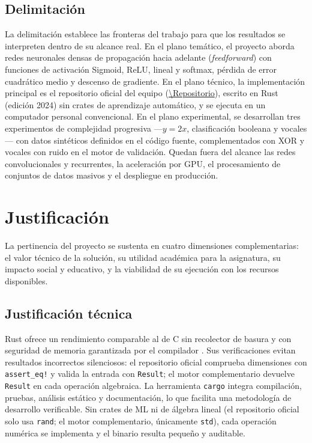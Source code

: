 \subsection{Delimitación}
La delimitación establece las fronteras del trabajo para que los resultados se interpreten dentro de su alcance real. En el plano temático, el proyecto aborda redes neuronales densas de propagación hacia adelante (\emph{feedforward}) con funciones de activación Sigmoid, ReLU, lineal y softmax, pérdida de error cuadrático medio y descenso de gradiente. En el plano técnico, la implementación principal es el repositorio oficial del equipo (\url{\Repositorio}), escrito en Rust (edición 2024) sin crates de aprendizaje automático, y se ejecuta en un computador personal convencional. En el plano experimental, se desarrollan tres experimentos de complejidad progresiva ---$y=2x$, clasificación booleana y vocales--- con datos sintéticos definidos en el código fuente, complementados con XOR y vocales con ruido en el motor de validación. Quedan fuera del alcance las redes convolucionales y recurrentes, la aceleración por GPU, el procesamiento de conjuntos de datos masivos y el despliegue en producción.

\section{Justificación}\label{sec:justificacion}
La pertinencia del proyecto se sustenta en cuatro dimensiones complementarias: el valor técnico de la solución, su utilidad académica para la asignatura, su impacto social y educativo, y la viabilidad de su ejecución con los recursos disponibles.

\subsection{Justificación técnica}
Rust ofrece un rendimiento comparable al de C sin recolector de basura y con seguridad de memoria garantizada por el compilador \citep{klabnik2023,jung2018}. Sus verificaciones evitan resultados incorrectos silenciosos: el repositorio oficial comprueba dimensiones con \texttt{assert\_eq!} y valida la entrada con \texttt{Result}; el motor complementario devuelve \texttt{Result} en cada operación algebraica. La herramienta \texttt{cargo} integra compilación, pruebas, análisis estático y documentación, lo que facilita una metodología de desarrollo verificable. Sin crates de ML ni de álgebra lineal (el repositorio oficial solo usa \texttt{rand}; el motor complementario, únicamente \texttt{std}), cada operación numérica se implementa y el binario resulta pequeño y auditable.

